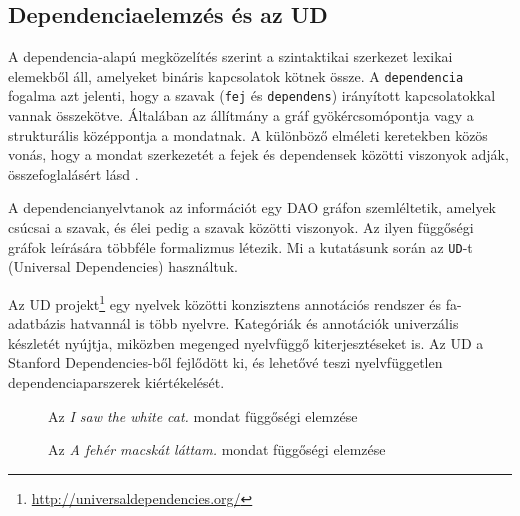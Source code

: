 \subsection{Dependenciaelemzés és az UD}
\label{sec:ud}
A dependencia-alapú megközelítés szerint a szintaktikai szerkezet lexikai elemekből áll, amelyeket bináris kapcsolatok kötnek össze. A \texttt{dependencia} fogalma azt jelenti, hogy a szavak (\texttt{fej} és \texttt{dependens}) irányított kapcsolatokkal vannak összekötve.  Általában az állítmány a gráf gyökércsomópontja vagy a strukturális középpontja a mondatnak. A különböző elméleti keretekben közös vonás, hogy a mondat szerkezetét a fejek és dependensek közötti viszonyok adják, összefoglalásért lásd \cite{Nivre:2005}.

A dependencianyelvtanok az információt egy DAO gráfon szemléltetik, amelyek csúcsai a szavak, és élei pedig a szavak közötti viszonyok. Az ilyen függőségi gráfok leírására többféle formalizmus létezik. Mi a kutatásunk során az \texttt{UD}-t (Universal Dependencies)\cite{deMarneffe:2014} használtuk.

Az UD projekt\footnote{\url{http://universaldependencies.org/}} egy nyelvek közötti konzisztens annotációs rendszer és fa-adatbázis hatvannál is több nyelvre. Kategóriák és annotációk univerzális készletét nyújtja, miközben megenged nyelvfüggő kiterjesztéseket is. Az UD a Stanford Dependencies-ből \cite{deMarneffe:2008} fejlődött ki, és lehetővé teszi nyelvfüggetlen dependenciaparszerek kiértékelését.

\begin{figure}[h]
\centering 
{}
\caption{Az \textit{I saw the white cat.} mondat függőségi elemzése}
\label{fig:deptreeEN}  
\end{figure}

\begin{figure}[h]
\centering 
{}
\caption{Az \textit{A fehér macskát láttam.} mondat függőségi elemzése}
\label{fig:deptreeHU}  
\end{figure}

